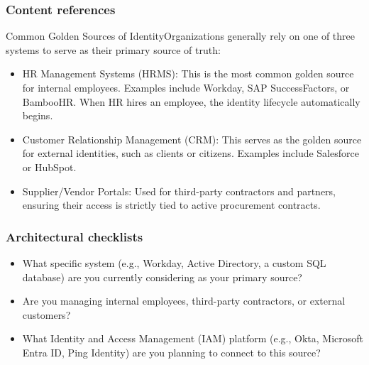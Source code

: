 \documentclass[13pt, aspectratio=169]{beamer}
\begin{document}
\begin{frame}
	\frametitle{Content references}

Common Golden Sources of IdentityOrganizations generally rely on one of three systems to serve as their primary source of truth:

\begin{itemize}
	\item HR Management Systems (HRMS): This is the most common golden source for internal employees. Examples include Workday, SAP SuccessFactors, or BambooHR. When HR hires an employee, the identity lifecycle automatically begins.
	\item Customer Relationship Management (CRM): This serves as the golden source for external identities, such as clients or citizens. Examples include Salesforce or HubSpot.
	\item Supplier/Vendor Portals: Used for third-party contractors and partners, ensuring their access is strictly tied to active procurement contracts.
\end{itemize}

\end{frame}

\begin{frame}
	\frametitle{Architectural checklists}
	
	\begin{itemize}
		\item What specific system (e.g., Workday, Active Directory, a custom SQL database) are you currently considering as your primary source?
		\item Are you managing internal employees, third-party contractors, or external customers?
		\item What Identity and Access Management (IAM) platform (e.g., Okta, Microsoft Entra ID, Ping Identity) are you planning to connect to this source?
	\end{itemize}
	
	
\end{frame}
\end{document}
